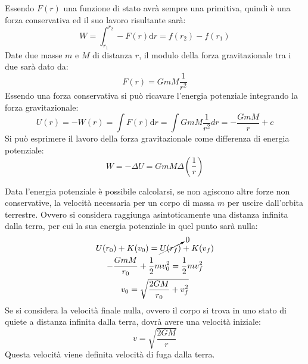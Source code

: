 \documentclass{article}
\newcommand{\df}{\mathrm{d}}
\numberwithin{equation}{subsection}
\begin{document}
Essendo $F(r)$ una funzione di stato avrà sempre una primitiva, quindi è una forza conservativa ed il suo lavoro risultante sarà:
\begin{equation*}
    W=\displaystyle\int_{r_1}^{r_2}-F(r)\df r=f(r_2)-f(r_1)
\end{equation*}
Date due masse $m$ e $M$ di distanza $r$, il modulo della forza gravitazionale tra i due sarà dato da:  
\begin{equation}
    F(r)=GmM\displaystyle\frac{1}{r^2}
\end{equation}
Essendo una forza conservativa si può ricavare l'energia potenziale integrando la forza gravitazionale:
\begin{equation}
    U(r)=-W(r)=\displaystyle\int F(r)\df r=\displaystyle\int GmM\frac{1}{r^2}dr=-\frac{GmM}{r}+c
\end{equation}
Si può esprimere il lavoro della forza gravitazionale come differenza di energia potenziale:
\begin{equation}
    W=-\Delta U=GmM\Delta\left(\displaystyle\frac{1}{r}\right)
\end{equation}

Data l'energia potenziale è possibile calcolarsi, se non agiscono altre forze non conservative, la velocità necessaria per un corpo di 
massa $m$ per uscire dall'orbita terrestre. Ovvero si considera raggiunga asintoticamente una distanza infinita dalla terra, per 
cui la sua energia potenziale in quel punto sarà nulla:
\begin{gather*}
    U(r_0)+K(v_0)=\cancelto{0}{U(r_f)}+K(v_f)\\
    -\displaystyle\frac{GmM}{r_0}+\frac{1}{2}mv_0^2=\frac{1}{2}mv_f^2\\
    v_0=\displaystyle\sqrt{\displaystyle\frac{2GM}{r_0}+v_f^2}
\end{gather*}
Se si considera la velocità finale nulla, ovvero il corpo si trova in uno stato di quiete a distanza infinita dalla terra, dovrà avere 
una velocità iniziale:
\begin{equation}
    v=\displaystyle\sqrt{\frac{2GM}{r}}
\end{equation}
Questa velocità viene definita velocità di fuga dalla terra. 
\end{document}
